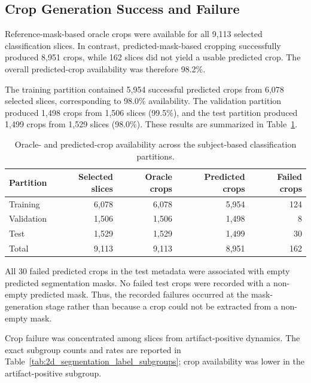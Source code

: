 \subsection{Crop Generation Success and Failure}
\label{subsec:results_crop_success}

Reference-mask-based oracle crops were available for all 9,113 selected classification slices. In contrast, predicted-mask-based cropping successfully produced 8,951 crops, while 162 slices did not yield a usable predicted crop. The overall predicted-crop availability was therefore 98.2\%.

The training partition contained 5,954 successful predicted crops from 6,078 selected slices, corresponding to 98.0\% availability. The validation partition produced 1,498 crops from 1,506 slices (99.5\%), and the test partition produced 1,499 crops from 1,529 slices (98.0\%). These results are summarized in Table~\ref{tab:roi_crop_availability}.

\begin{table}[htbp]
\centering
\caption{Oracle- and predicted-crop availability across the subject-based classification partitions.}
\label{tab:roi_crop_availability}
\begin{tabular}{lrrrr}
\hline
Partition & Selected slices & Oracle crops & Predicted crops & Failed crops \\
\hline
Training & 6,078 & 6,078 & 5,954 & 124 \\
Validation & 1,506 & 1,506 & 1,498 & 8 \\
Test & 1,529 & 1,529 & 1,499 & 30 \\
\hline
Total & 9,113 & 9,113 & 8,951 & 162 \\
\hline
\end{tabular}
\end{table}

All 30 failed predicted crops in the test metadata were associated with empty predicted segmentation masks. No failed test crops were recorded with a non-empty predicted mask. Thus, the recorded failures occurred at the mask-generation stage rather than because a crop could not be extracted from a non-empty mask.

Crop failure was concentrated among slices from artifact-positive dynamics. The exact subgroup counts and rates are reported in Table~\ref{tab:2d_segmentation_label_subgroups}; crop availability was lower in the artifact-positive subgroup.


